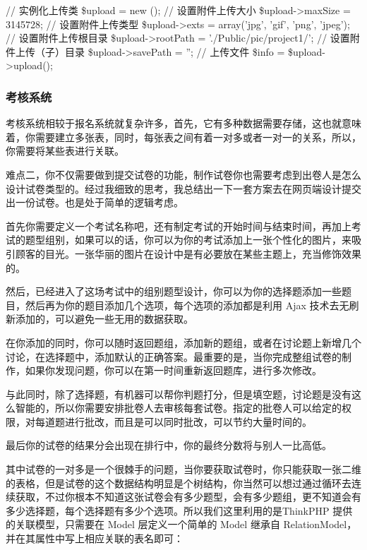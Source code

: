 \begin{code}
// 实例化上传类
\$upload = new \Think\Upload();
// 设置附件上传大小
\$upload->maxSize = 3145728;
// 设置附件上传类型
\$upload->exts = array('jpg', 'gif', 'png', 'jpeg');
// 设置附件上传根目录
\$upload->rootPath = './Public/pic/project1/';
// 设置附件上传（子）目录
\$upload->savePath = '';
 // 上传文件
\$info = \$upload->upload();
\end{code}

\subsubsection{考核系统}

考核系统相较于报名系统就复杂许多，首先，它有多种数据需要存储，这也就意味着，你需要建立多张表，同时，每张表之间有着一对多或者一对一的关系，所以，你需要将某些表进行关联。

难点二，你不仅需要做到提交试卷的功能，制作试卷你也需要考虑到出卷人是怎么设计试卷类型的。经过我细致的思考，我总结出一下一套方案去在网页端设计提交出一份试卷。也是处于简单的逻辑考虑。

首先你需要定义一个考试名称吧，还有制定考试的开始时间与结束时间，再加上考试的题型组别，如果可以的话，你可以为你的考试添加上一张个性化的图片，来吸引顾客的目光。一张华丽的图片在设计中是有必要放在某些主题上，充当修饰效果的。

然后，已经进入了这场考试中的组别题型设计，你可以为你的选择题添加一些题目，然后再为你的题目添加几个选项，每个选项的添加都是利用 Ajax 技术去无刷新添加的，可以避免一些无用的数据获取。

在你添加的同时，你可以随时返回题组，添加新的题组，或者在讨论题上新增几个讨论，在选择题中，添加默认的正确答案。最重要的是，当你完成整组试卷的制作，如果你发现问题，你可以在第一时间重新返回题库，进行多次修改。

与此同时，除了选择题，有机器可以帮你判题打分，但是填空题，讨论题是没有这么智能的，所以你需要安排批卷人去审核每套试卷。指定的批卷人可以给定的权限，对每道题进行批改，而且是可以同时批改，可以节约大量时间的。

最后你的试卷的结果分会出现在排行中，你的最终分数将与别人一比高低。

其中试卷的一对多是一个很棘手的问题，当你要获取试卷时，你只能获取一张二维的表格，但是试卷的这个数据结构明显是个树结构，你当然可以想过通过循环去连续获取，不过你根本不知道这张试卷会有多少题型，会有多少题组，更不知道会有多少选择题，每个选择题有多少个选项。所以我们这里利用的是ThinkPHP 提供的关联模型，只需要在 Model 层定义一个简单的 Model 继承自 RelationModel，并在其属性中写上相应关联的表名即可：

